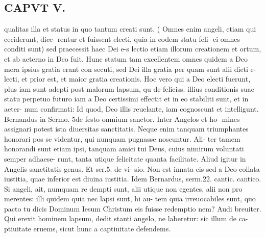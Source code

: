 \documentclass{article}
\begin{document}
\begin{pages}
\section*{CAPVT  V. }
\marginpar{[ p.335 ]}qualitas illa et status in quo tantum creati sunt. ( Omnes enim angeli, etiam qui ceciderunt, dice- rentur et fuissent electi, quia in eodem statu feli- ci omnes conditi sunt) sed praecessit haec Dei e-s lectio etiam illorum creationem et ortum, et ab aeterno in Deo fuit. Hunc statum tam excellentem omnes quidem a Deo mera ipsius gratia erant con secuti, sed Dei illa gratia per quam sunt alii dicti e- lecti, et prior est, et maior gratia creationis. Hoc vero qui a Deo electi fuerunt, plus iam sunt adepti post malorum lapsum, qu de feliciss. illius conditionis suae statu perpetuo futuro iam a Deo certissimi effectit et in eo stabiliti sunt, et in aeter- num confirmati: Id quod, Deo illis reuelante, iam cognoscunt et intelligunt. Bernandus in Sermo. 5de festo omnium sanctor. Inter Angelos et ho- mines assignari potest ista diuersitas sanctitatis. Neque enim tanquam triumphantes honorari pos se videntur, qui nunquam pugnasse noscuntur. Ali- ter tamem honorandi sunt etiam ipsi, tanquam amici tui Deus, cuius nimirum voluntati semper adhaese- runt, tanta utique felicitate quanta facilitate. Aliud igitur in Angelis sanctitatis genus. Et ser.5. de vi- sio. Non est innata eis sed a Deo collata iustitia, quae inferior est diuina iustitia. Idem Bernardus, serm.22. cantic. cantico. Si angeli, ait, numquam re dempti sunt, alii utique non egentes, alii non pro merentes: illi quidem quia nec lapsi sunt, hi au- tem quia irreuocabiles sunt, quo pacto tu dicis Dominum Iesum Christum eis fuisse redemptio nem? Audi breuiter. Qui erexit hominem lapsum, dedit stanti angelo, ne laberetur: sic illum de ca- ptiuitate eruems, sicut hunc a captiuitate defendems. 

\end{pages}
\end{document}
